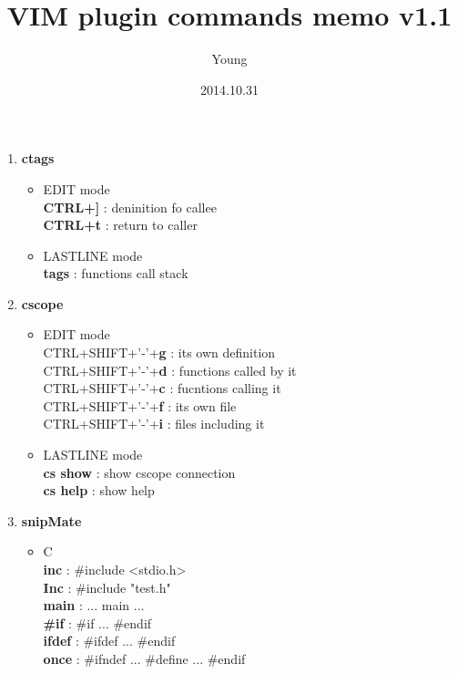 \documentclass[10pt, a4paper]{article}
\begin{document}
\twocolumn

\pagestyle{empty}
\title{VIM plugin commands memo v1.1}
\author{Young}
\date{2014.10.31}
\maketitle
\thispagestyle{empty} %

\setlength{\baselineskip}{12pt} %

\begin{enumerate}
\item{\textbf{ctags}}
	\begin{itemize}
	\item{EDIT mode} \\
	\textbf{CTRL+]} : deninition fo callee \\
	\textbf{CTRL+t} : return to caller 
	\item{LASTLINE mode} \\
	\textbf{tags} : functions call stack
	\end{itemize}
\item{\textbf{cscope}}
	\begin{itemize}
	\item{EDIT mode} \\
	CTRL+SHIFT+'-'+\textbf{g} : its own definition \\
	CTRL+SHIFT+'-'+\textbf{d} : functions called by it \\
	CTRL+SHIFT+'-'+\textbf{c} : fucntions calling it \\
	CTRL+SHIFT+'-'+\textbf{f} : its own file \\
	CTRL+SHIFT+'-'+\textbf{i} : files including it
	\item{LASTLINE mode} \\
	\textbf{cs show} : show cscope connection \\
	\textbf{cs help} : show help
	\end{itemize}
\item{\textbf{snipMate}}
	\begin{itemize}
	\item C \\
	\textbf{inc} : \#include <stdio.h>  \\
	\textbf{Inc} : \#include "test.h" \\
	\textbf{main} : ... main ... \\
	\textbf{\#if} : \#if ... \#endif \\
	\textbf{ifdef} : \#ifdef ... \#endif \\
	\textbf{once} : \#ifndef ... \#define ... \#endif \\

\end{itemize}
\end{enumerate}
\end{document}
